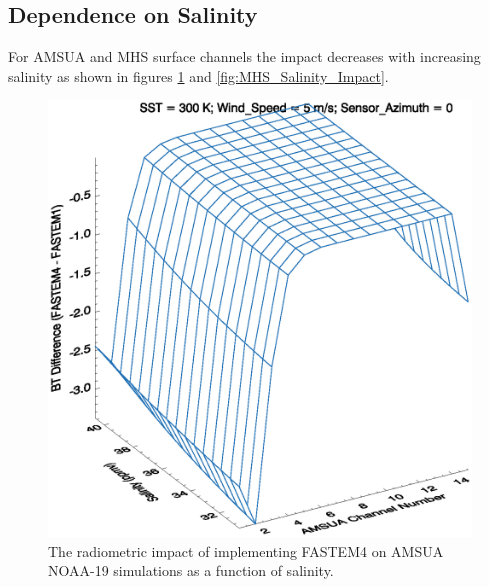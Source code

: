 \newpage

\subsection{Dependence on Salinity}
For AMSUA and MHS surface channels the impact decreases with increasing salinity as shown in figures \ref{fig:AMSUA_Salinity_Impact} and \ref{fig:MHS_Salinity_Impact}.  

\begin{figure}[htp]
  \centering
  \includegraphics[scale=0.75]{graphics/AMSUA_Salinity_BT.eps}
  \caption{The radiometric impact of implementing FASTEM4 on AMSUA NOAA-19 simulations as a function of salinity.}
  \label{fig:AMSUA_Salinity_Impact}
\end{figure}

